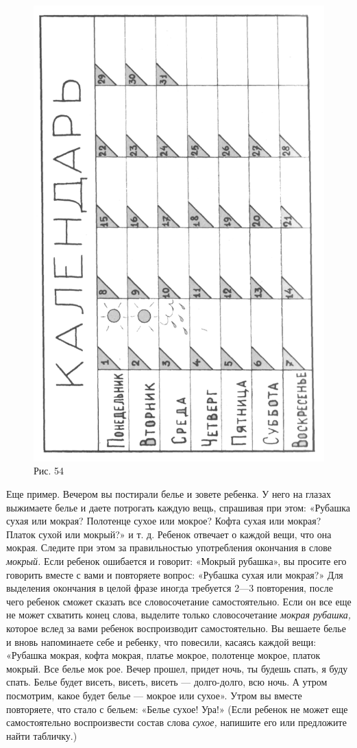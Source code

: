 \documentclass{book}
\renewcommand{\emph}[1]{\textit{#1}}
\begin{document}
\begin{figure}
\centering
\includegraphics[width=0.9\linewidth]{media/media/image50.png}
\caption*{Рис. 54}
\end{figure}

Еще пример. Вечером вы постирали белье и зовете ребенка. У него на
глазах выжимаете белье и даете потрогать каждую вещь, спрашивая при
этом: «Рубашка сухая или мокрая? Полотенце сухое или мокрое? Кофта сухая
или мокрая? Платок сухой или мокрый?» и т. д. Ребенок отвечает о каждой
вещи, что она мокрая. Следите при этом за правильностью употребления
окончания в слове \emph{мокрый.} Если ребенок ошибается и говорит:
«Мокрый рубашка», вы просите его говорить вместе с вами и повторяете
вопрос: «Рубашка сухая или мокрая?» Для выделения окончания в целой
фразе иногда требуется 2---3 повторения, после чего ребенок сможет
сказать все словосочетание самостоятельно. Если он все еще не может
схватить конец слова, выделите только словосочетание \emph{мокрая
рубашка,} которое вслед за вами ребенок воспроизводит самостоятельно. Вы
вешаете белье и вновь напоминаете себе и ребенку, что повесили, касаясь
каждой вещи: «Рубашка мокрая, кофта мокрая, платье мокрое, полотенце
мокрое, платок мокрый. Все белье мок рое. Вечер прошел, придет ночь, ты
будешь спать, я буду спать. Белье будет висеть, висеть, висеть ---
долго-долго, всю ночь. А утром посмотрим, какое будет белье --- мокрое
или сухое». Утром вы вместе повторяете, что стало с бельем: «Белье
сухое! Ура!» (Если ребенок не может еще самостоятельно воспроизвести
состав слова \emph{сухое,} напишите его или предложите найти табличку.)
\end{document}
